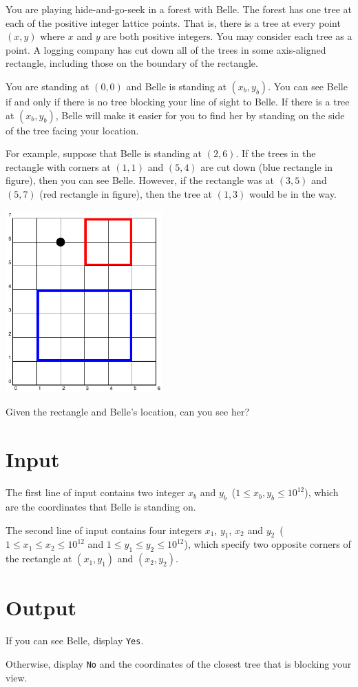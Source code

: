 
You are playing hide-and-go-seek in a forest with Belle.  The forest
has one tree at each of the positive integer lattice points.  That is,
there is a tree at every point $(x,y)$ where $x$ and $y$ are both
positive integers.  You may consider each tree as a point.  A logging
company has cut down all of the trees in some axis-aligned rectangle,
including those on the boundary of the rectangle.

You are standing at $(0,0)$ and Belle is standing at $(x_b,y_b)$.
You can see Belle if and only if there is no tree blocking your line of
sight to Belle. If there is a tree at $(x_b,y_b)$, Belle will make
it easier for you to find her by standing on the side of the tree
facing your location.

For example, suppose that Belle is standing at $(2,6)$.  If the
trees in the rectangle with corners at $(1,1)$ and $(5,4)$ are cut
down (blue rectangle in figure), then you can see Belle.  However,
if the rectangle was at $(3,5)$ and $(5,7)$ (red rectangle in figure),
then the tree at $(1,3)$ would be in the way.

\begin{center}
	\includegraphics[width=0.45\textwidth]{trees.pdf}
\end{center}

Given the rectangle and Belle's location, can you see her?

\section*{Input}

The first line of input contains two integer $x_b$ and $y_b$~($1 \leq x_b,y_b \leq 10^{12}$), which are the coordinates that Belle is 
standing on.

The second line of input contains four integers $x_1$, $y_1$, $x_2$ and $y_2$~($1 \leq x_1 \leq x_2 \leq 10^{12}$ and $1 \leq y_1 \leq y_2 
\leq 10^{12}$), which specify two opposite corners of the rectangle at $(x_1, y_1)$ and $(x_2, y_2)$.

\section*{Output}

If you can see Belle, display \texttt{Yes}.

Otherwise, display \texttt{No} and the coordinates of the closest tree
that is blocking your view.
